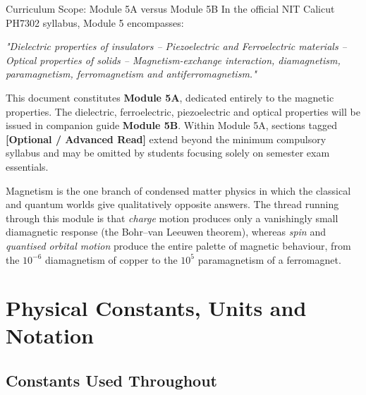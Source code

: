 \documentclass[11pt,a4paper]{article}
\begin{document}
\begin{enrichmentnote}{Curriculum Scope: Module 5A versus Module 5B}
In the official NIT Calicut PH7302 syllabus, Module 5 encompasses:
\begin{center}
\textit{"Dielectric properties of insulators -- Piezoelectric and Ferroelectric materials -- Optical properties of solids -- Magnetism-exchange interaction, diamagnetism, paramagnetism, ferromagnetism and antiferromagnetism."}
\end{center}
This document constitutes \textbf{Module 5A}, dedicated entirely to the magnetic properties. The dielectric, ferroelectric, piezoelectric and optical properties will be issued in companion guide \textbf{Module 5B}. Within Module 5A, sections tagged \textbf{[Optional / Advanced Read]} extend beyond the minimum compulsory syllabus and may be omitted by students focusing solely on semester exam essentials.
\end{enrichmentnote}

Magnetism is the one branch of condensed matter physics in which the classical and quantum worlds give qualitatively opposite answers. The thread running through this module is that \emph{charge} motion produces only a vanishingly small diamagnetic response (the Bohr--van Leeuwen theorem), whereas \emph{spin} and \emph{quantised orbital motion} produce the entire palette of magnetic behaviour, from the $10^{-6}$ diamagnetism of copper to the $10^{5}$ paramagnetism of a ferromagnet.

\section{Physical Constants, Units and Notation}
\label{sec:constants}

\subsection{Constants Used Throughout}
\end{document}
